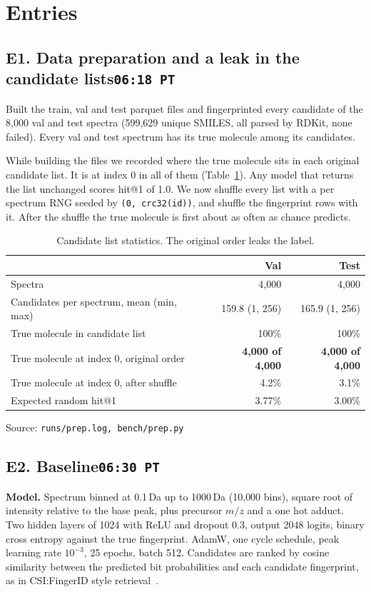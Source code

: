 \documentclass[11pt]{article}
\newcommand{\entry}[2]{\subsection*{#1\hfill{\normalfont\small\texttt{#2}}}}
\newcommand{\src}[1]{{\small\color{black!60}Source: \texttt{#1}}}
\begin{document}
\section*{Entries}

\entry{E1. Data preparation and a leak in the candidate lists}{06:18 PT}

Built the train, val and test parquet files and fingerprinted every candidate of the 8{,}000 val and test spectra
(599{,}629 unique SMILES, all parsed by RDKit, none failed). Every val and test spectrum has its true molecule among its
candidates.

While building the files we recorded where the true molecule sits in each original candidate list.
It is at index 0 in all of them (Table~\ref{tab:leak}). Any model that returns the list unchanged scores hit@1 of 1.0.
We now shuffle every list with a per spectrum RNG seeded by \texttt{(0, crc32(id))}, and shuffle the fingerprint rows
with it. After the shuffle the true molecule is first about as often as chance predicts.

\begin{table}[h]
\centering
\begin{tabular}{lrr}
\toprule
 & Val & Test \\
\midrule
Spectra & 4{,}000 & 4{,}000 \\
Candidates per spectrum, mean (min, max) & 159.8 (1, 256) & 165.9 (1, 256) \\
True molecule in candidate list & 100\% & 100\% \\
True molecule at index 0, original order & \textbf{4{,}000 of 4{,}000} & \textbf{4{,}000 of 4{,}000} \\
True molecule at index 0, after shuffle & 4.2\% & 3.1\% \\
Expected random hit@1 & 3.77\% & 3.00\% \\
\bottomrule
\end{tabular}
\caption{Candidate list statistics. The original order leaks the label.}
\label{tab:leak}
\end{table}
\src{runs/prep.log, bench/prep.py}

\entry{E2. Baseline}{06:30 PT}

\textbf{Model.} Spectrum binned at 0.1\,Da up to 1000\,Da (10{,}000 bins), square root of intensity relative to the base
peak, plus precursor $m/z$ and a one hot adduct. Two hidden layers of 1024 with ReLU and dropout 0.3, output 2048
logits, binary cross entropy against the true fingerprint. AdamW, one cycle schedule, peak learning rate
$10^{-3}$, 25 epochs, batch 512. Candidates are ranked by cosine similarity between the predicted bit probabilities and
each candidate fingerprint, as in CSI:FingerID style retrieval~\cite{csifingerid}.
\end{document}
